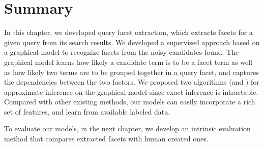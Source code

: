 \section{Summary}
In this chapter, we developed query facet extraction, which extracts facets for a given query from its search results. We developed a supervised approach based on a graphical model to recognize facets from the noisy candidates found. The graphical model learns how likely a candidate term is to be a facet term as well as how likely two terms are to be grouped together in a query facet, and captures the dependencies between the two factors. We proposed two algorithms (\QFI and \QFJ) for approximate inference on the graphical model since exact inference is intractable. Compared with other existing methods, our models can easily incorporate a rich set of features, and learn from available labeled data.

To evaluate our models, in the next chapter, we develop an intrinsic evaluation method that compares extracted facets with human created ones.
